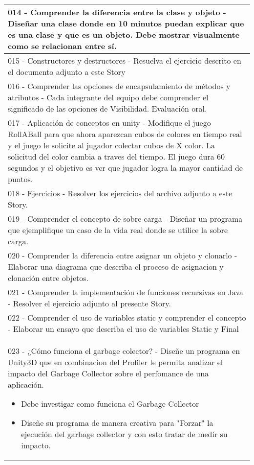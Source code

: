 \begin{center}
\begin{longtable}{ | p{18cm} | }
        \hline
        014 - Comprender la diferencia entre la clase y objeto - Diseñar una clase donde en 10 minutos puedan explicar que es una clase y que es un objeto. Debe mostrar visualmente como se relacionan entre sí. \\
        \hline
        015 - Constructores y destructores - Resuelva el ejercicio descrito en el documento adjunto a este Story \\
        \hline
        016 - Comprender las opciones de encapsulamiento de métodos y atributos - Cada integrante del equipo debe comprender el significado de las opciones de Visibilidad. Evaluación oral. \\
        \hline
        017 - Aplicación de conceptos en unity - Modifique el juego RollABall para que ahora aparezcan cubos de colores en tiempo real y el juego le solicite al jugador colectar cubos de X color. La solicitud del color cambia a traves del tiempo. El juego dura 60 segundos y el objetivo es ver que jugador logra la mayor cantidad de puntos.  \\
        \hline
        018 - Ejercicios - Resolver los ejercicios del archivo adjunto a este Story. \\
        \hline
        019 - Comprender el concepto de sobre carga - Diseñar un programa que ejemplifique un caso de la vida real donde se utilice la sobre carga. \\
        \hline
        020 - Comprender la diferencia entre asignar un objeto y clonarlo -  Elaborar una diagrama que describa el proceso de asignacion y clonación entre objetos.  \\
        \hline
        021 - Comprender la implementación de funciones recursivas en Java - Resolver el ejercicio adjunto al presente Story. \\
        \hline
        022 - Comprender el uso de variables static y comprender el concepto - Elaborar un ensayo que describa el uso de variables Static y Final \\
        \hline
        023 - ¿Cómo funciona el garbage colector? - Diseñe un programa en Unity3D que en combinacion del Profiler le permita analizar el impacto del Garbage Collector sobre el perfomance de una aplicación.
        \begin{itemize}
            \item Debe investigar como funciona el Garbage Collector
            \item Diseñe su programa de manera creativa para "Forzar" la ejecución del garbage collector y con esto tratar de medir su impacto.

\end{itemize}
\end{longtable}
\end{center}
